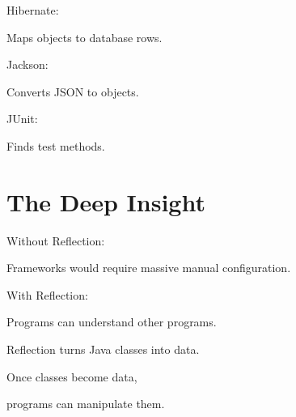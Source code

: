 \documentclass[11pt,a4paper]{book}
\begin{document}

Hibernate:


Maps objects to database rows.


Jackson:


Converts JSON to objects.


JUnit:


Finds test methods.


\section{The Deep Insight}

Without Reflection:


Frameworks would require
massive manual configuration.


With Reflection:


Programs can understand
other programs.


\begin{idea}

Reflection turns Java classes
into data.


Once classes become data,

programs can manipulate them.

\end{idea}

\end{document}
